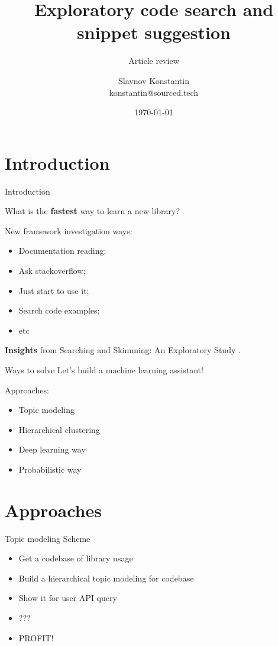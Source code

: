 \documentclass[10pt,aspectratio=1610]{beamer}
\title{Exploratory code search and snippet suggestion}
\subtitle{Article review}
\date{\today}
\author{Slavnov Konstantin\\konstantin@sourced.tech}
\begin{document}
\maketitle

\section{Introduction}

  

\begin{frame}[fragile]{Introduction}

  What is the \textbf{fastest} way to learn a new library? 

  New framework investigation ways:
  \begin{itemize}
    \item Documentation reading;
    \item Ask stackoverflow;
    \item \alert<2>{Just start to use it;}
    \item \alert<2>{Search code examples;}
    \item etc
  \end{itemize}

  \vfill
  \pause
  \textbf{Insights} from Searching and Skimming: An Exploratory Study \cite{starke2009searching}.

\end{frame}
\begin{frame}[fragile]{Ways to solve}
  Let's build a machine learning assistant! 

  Approaches:
  \begin{itemize}
    \item \alert<2>{Topic modeling}
    \item Hierarchical clustering
    \item Deep learning way
    \item Probabilistic way
  \end{itemize}
\end{frame}


\section{Approaches}

\begin{frame}{Topic modeling}
  Scheme
  \begin{itemize}
    \item Get a codebase of library usage
    \item Build a hierarchical topic modeling for codebase
    \item Show it for user API query
    \item ???
    \item PROFIT!
  \end{itemize}
\end{frame}
\end{document}
